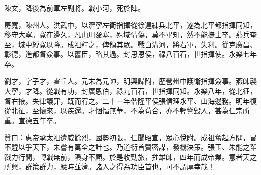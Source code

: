 \begin{pinyinscope}
陳文，降後為前軍左副將。戰小河，死於陣。

房寬，陳州人。洪武中，以濟寧左衛指揮從徐達練兵北平，遂為北平都指揮同知，移守大寧。寬在邊久，凡山川夋塞，殊域情偽，莫不畢知，然不能撫士卒。燕兵奄至，城中縛寬以降。成祖釋之，俾領其眾。戰白溝河，將右軍，失利。從克廣昌、彰德，進都督僉事。以舊臣，略其過。封思恩侯，祿八百石，世指揮使。永樂七年卒。

劉才，字子才，霍丘人。元末為元帥，明興歸附，歷營州中護衛指揮僉事。燕師襲大寧，才降。從戰有功，封廣恩伯，祿九百石，世指揮同知。永樂八年，從北征，督右掖。失律議罪，既而宥之。二十一年偕隆平侯張信理永平、山海邊務。明年復從北征，至懷來，以疾還。才悃愊無華，不為茍合，亦不輕訾毀人，甚為仁宗所重。宣德五年卒。

贊曰：惠帝承太祖遺威餘烈，國勢初張，仁聞昭宣，眾心悅附。成祖奮起方隅，冒不韙以爭天下，未嘗有萬全之計也。乃道衍首贊密謀，發機決策。張玉、朱能之輩戮力行間，轉戰無前，隕身不顧。於是收勁旅，摧雄師，四年而成帝業。意者天之所興，群策群力，應時並濟。諸人之得為功臣首也，可不謂厚幸哉！


\end{pinyinscope}